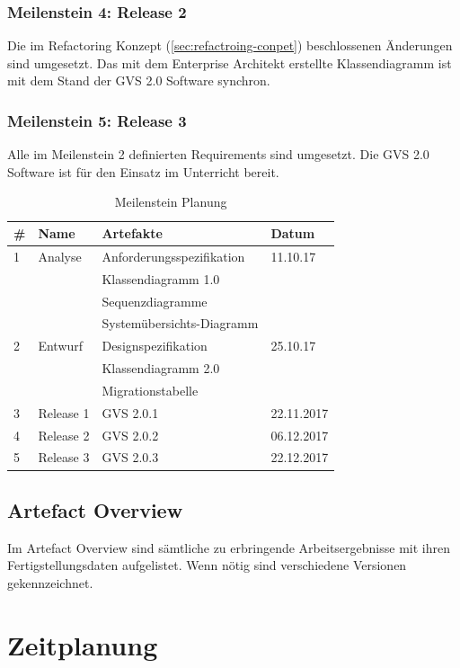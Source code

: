 \documentclass[11pt,a4paper,english,oneside]{book}
\numberwithin{equation}{chapter}
\begin{document}
	\subsubsection{Meilenstein 4: Release 2}
	Die im Refactoring Konzept (\ref{sec:refactroing-conpet}) beschlossenen Änderungen sind umgesetzt. Das mit dem Enterprise Architekt erstellte Klassendiagramm ist mit dem Stand der GVS 2.0 Software synchron.
	
	\subsubsection{Meilenstein 5: Release 3}
	Alle im Meilenstein 2 definierten Requirements sind umgesetzt. Die GVS 2.0 Software ist für den Einsatz im Unterricht bereit.
	
	\begin{table}[h!]
		\centering
		\begin{tabular}{l l l l}
			\toprule 
			\# & Name & Artefakte & Datum \\
			\toprule 
			1 & Analyse & Anforderungsspezifikation & 11.10.17 \\
			& & Klassendiagramm 1.0 & \\
			& & Sequenzdiagramme & \\
			& &  Systemübersichts-Diagramm & \\
			\midrule
			2 & Entwurf  & Designspezifikation & 25.10.17\\
			& & Klassendiagramm 2.0 & \\
			& & Migrationstabelle & \\
			\midrule
			3 & Release 1 & GVS 2.0.1 & 22.11.2017 \\
			\midrule
			4 & Release 2 & GVS 2.0.2 & 06.12.2017 \\
			\midrule
			5 & Release 3 & GVS 2.0.3 & 22.12.2017 \\
			\bottomrule 
		\end{tabular} 
		\caption{Meilenstein Planung} 
	\end{table}
	
	\subsection{Artefact Overview}
	Im Artefact Overview sind sämtliche zu erbringende Arbeitsergebnisse mit ihren Fertigstellungsdaten aufgelistet. Wenn nötig sind verschiedene Versionen gekennzeichnet.
	
	
	\section{Zeitplanung}
	
\end{document}
